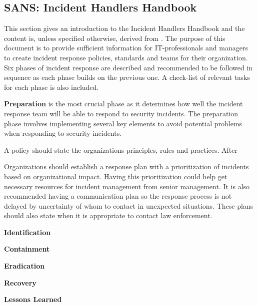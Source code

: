 \subsection{SANS: Incident Handlers Handbook}
This section gives an introduction to the Incident Handlers Handbook and the content is, unless specified otherwise, derived from \cite{SANShandbook}. The purpose of this document is to provide sufficient information for IT-professionals and managers to create incident response policies, standards and teams for their organization. Six phases of incident response are described and recommended to be followed in sequence as each phase builds on the previous one. A check-list of relevant tasks for each phase is also included.

\textbf{Preparation} is the most crucial phase as it determines how well the incident response team will be able to respond to security incidents. The preparation phase involves implementing several key elements to avoid potential problems when responding to security incidents.

A policy should state the organizations principles, rules and practices. After   

Organizations should establish a response plan with a prioritization of incidents based on organizational impact. Having this prioritization could help get necessary resources for incident management from senior management. It is also recommended having a communication plan so the response process is not delayed by uncertainty of whom to contact in unexpected situations. These plans should also state when it is appropriate to contact law enforcement.

\textbf{Identification}

\textbf{Containment}

\textbf{Eradication}

\textbf{Recovery}

\textbf{Lessons Learned}